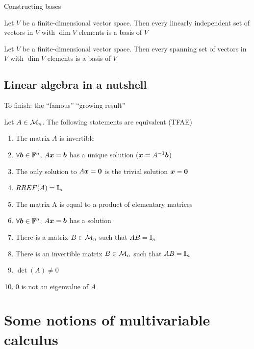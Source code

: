 \documentclass[aspectratio=169]{beamer}
\begin{document}
\begin{frame}{Constructing bases}
	\begin{theorem}
		Let $V$ be a finite-dimensional vector space. Then every linearly independent set of vectors in $V$ with $\dim V$ elements is a basis of $V$
	\end{theorem}
	\vfill
	\begin{theorem}
		Let $V$ be a finite-dimensional vector space. Then every spanning set of vectors in $V$ with $\dim V$ elements is a basis of $V$
	\end{theorem}
\end{frame}



\subsection{Linear algebra in a nutshell}
\begin{frame}{To finish: the ``famous'' ``growing result''}
\begin{importanttheorem}
Let $A\in\mathcal{M}_n$. The following statements are equivalent (TFAE)
\begin{enumerate}
\item The matrix $A$ is invertible
\item $\forall\bm{b}\in\mathbb{F}^n$, $A\bm{x} = \bm{b}$ has a unique solution ($\bm{x}=A^{-1}\bm{b}$)
\item The only solution to $A\bx = \b0$ is the trivial solution $\bx = \b0$
\item $RREF(A)=\mathbb{I}_n$
\item The matrix A is equal to a product of elementary matrices
\item $\forall\bm{b}\in\mathbb{F}^n$, $A\bm{x} = \bm{b}$ has a solution
\item There is a matrix $B\in\mathcal{M}_n$ such that $AB = \mathbb{I}_n$
\item There is an invertible matrix $B\in\mathcal{M}_n$ such that $AB = \mathbb{I}_n$
\item $\det(A)\neq 0$
\item $0$ is not an eigenvalue of $A$
\end{enumerate}
\end{importanttheorem}
\end{frame}



\section{Some notions of multivariable calculus}
\end{document}
